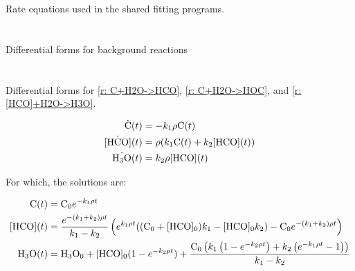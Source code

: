 Rate equations used in the shared fitting programs.

\section{}

Differential forms for background reactions


\section{}


\section{}

Differential forms for \ref{r: C+H2O->HCO}, \ref{r: C+H2O->HOC}, and \ref{r: [HCO]+H2O->H3O}.

\begin{align}
	\dot{\ce{C}}(t) & = -k_1 \rho \ce{C}(t) \\
	\dot{\ce{[HCO]}}(t) & = \rho(k_1 \ce{C}(t) + k_2 \ce{[HCO]}(t)) \\
	\dot{\ce{H3O}}(t) & = k_2 \rho \ce{[HCO]}(t)
\end{align}

For which, the solutions are:

\begin{align*}
	\ce{C}(t) & = \ce{C0} e^{-k_1 \rho t} \\
	\ce{[HCO]}(t) & = \frac{e^{-(k_1 + k_2) \rho t}}{k_1 - k_2} \left(e^{k_1 \rho t}((\ce{C0} + \ce{[HCO]0})k_1 - \ce{[HCO]0} k_2) - \ce{C0} e^{-(k_1 + k_2) \rho t}\right) \\
	\ce{H3O}(t) & = \ce{H3O0} + \ce{[HCO]0} (1 - e^{-k_2 \rho t}) + \frac{\ce{C0}\left( k_1 \left(1 - e^{-k_2 \rho t}\right) + k_2 \left(e^{-k_1 \rho t} - 1\right) \right)}{k_1 - k_2}
\end{align*}